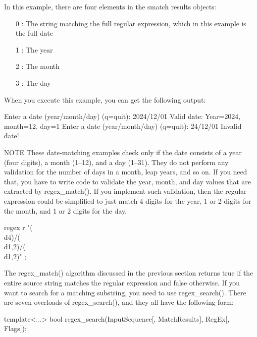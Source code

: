 In this example, there are four elements in the smatch results objects:

\begin{itemize}
\item
[0]: The string matching the full regular expression, which in this example is the full date

\item
[1]: The year

\item
[2]: The month

\item
[3]: The day
\end{itemize}

When you execute this example, you can get the following output:

\begin{shell}
Enter a date (year/month/day) (q=quit): 2024/12/01
    Valid date: Year=2024, month=12, day=1
Enter a date (year/month/day) (q=quit): 24/12/01
    Invalid date!
\end{shell}

\begin{myNotic}{NOTE}
These date-matching examples check only if the date consists of a year (four digits), a month (1–12), and a day (1–31). They do not perform any validation for the number of days in a month, leap years, and so on. If you need that, you have to write code to validate the year, month, and day values that are extracted by regex\_match(). If you implement such validation, then the regular expression could be simplified to just match 4 digits for the year, 1 or 2 digits for the month, and 1 or 2 digits for the day.

\begin{cpp}
regex r { "(\\d{4})/(\\d{1,2})/(\\d{1,2})" };
\end{cpp}
\end{myNotic}


The regex\_match() algorithm discussed in the previous section returns true if the entire source string matches the regular expression and false otherwise. If you want to search for a matching substring, you need to use regex\_search(). There are seven overloads of regex\_search(), and they all have the following form:

\begin{cpp}
template<...>
bool regex_search(InputSequence[, MatchResults], RegEx[, Flags]);
\end{cpp}

